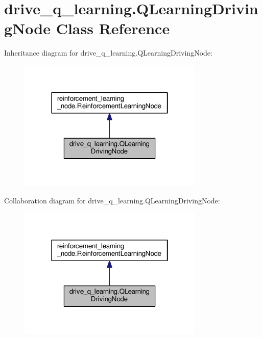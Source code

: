 \hypertarget{classdrive__q__learning_1_1_q_learning_driving_node}{}\section{drive\+\_\+q\+\_\+learning.\+Q\+Learning\+Driving\+Node Class Reference}
\label{classdrive__q__learning_1_1_q_learning_driving_node}


Inheritance diagram for drive\+\_\+q\+\_\+learning.\+Q\+Learning\+Driving\+Node\+:
\nopagebreak
\begin{figure}[H]
\begin{center}
\leavevmode
\includegraphics[width=250pt]{classdrive__q__learning_1_1_q_learning_driving_node__inherit__graph}
\end{center}
\end{figure}


Collaboration diagram for drive\+\_\+q\+\_\+learning.\+Q\+Learning\+Driving\+Node\+:
\nopagebreak
\begin{figure}[H]
\begin{center}
\leavevmode
\includegraphics[width=250pt]{classdrive__q__learning_1_1_q_learning_driving_node__coll__graph}
\end{center}
\end{figure}
